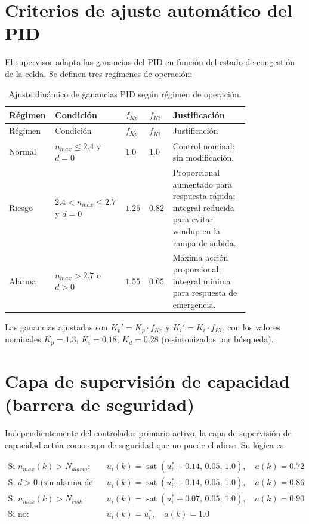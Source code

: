 \section{Criterios de ajuste automático del PID}

El supervisor adapta las ganancias del PID en función del estado de congestión de la celda. Se definen tres regímenes de operación:

\begin{longtable}{@{}P{0.13\linewidth}P{0.22\linewidth}P{0.07\linewidth}P{0.07\linewidth}P{0.31\linewidth}@{}}
\caption{Ajuste dinámico de ganancias PID según régimen de operación.}
\label{tab:sv_pid_gains}\\
\toprule
Régimen & Condición & $f_{Kp}$ & $f_{Ki}$ & Justificación \\ \midrule \endfirsthead
\toprule Régimen & Condición & $f_{Kp}$ & $f_{Ki}$ & Justificación \\ \midrule \endhead
Normal & $n_{max}\!\leq\!2.4$ y $d=0$ & $1.0$ & $1.0$ & Control nominal; sin modificación.\\
Riesgo & $2.4<n_{max}\leq2.7$ y $d=0$ & $1.25$ & $0.82$ & Proporcional aumentado para respuesta rápida; integral reducida para evitar windup en la rampa de subida.\\
Alarma & $n_{max}\!>\!2.7$ o $d>0$ & $1.55$ & $0.65$ & Máxima acción proporcional; integral mínima para respuesta de emergencia.\\
\bottomrule
\end{longtable}

Las ganancias ajustadas son $K_p' = K_p \cdot f_{Kp}$ y $K_i' = K_i \cdot f_{Ki}$, con los valores nominales $K_p=1.3$, $K_i=0.18$, $K_d=0.28$ (resintonizados por búsqueda).

\section{Capa de supervisión de capacidad (barrera de seguridad)}

Independientemente del controlador primario activo, la capa de supervisión de capacidad actúa como capa de seguridad que no puede eludirse. Su lógica es:

\begin{align}
\text{Si } n_{max}(k) > N_{alarm}: &\quad u_i(k) = \operatorname{sat}(u_i^* + 0.14,\, 0.05,\, 1.0),\quad a(k) = 0.72 \\
\text{Si } d>0 \text{ (sin alarma de capacidad)}: &\quad u_i(k) = \operatorname{sat}(u_i^* + 0.14,\, 0.05,\, 1.0),\quad a(k) = 0.86 \\
\text{Si } n_{max}(k) > N_{risk}: &\quad u_i(k) = \operatorname{sat}(u_i^* + 0.07,\, 0.05,\, 1.0),\quad a(k) = 0.90 \\
\text{Si no}: &\quad u_i(k) = u_i^*,\quad a(k) = 1.0
\end{align}

